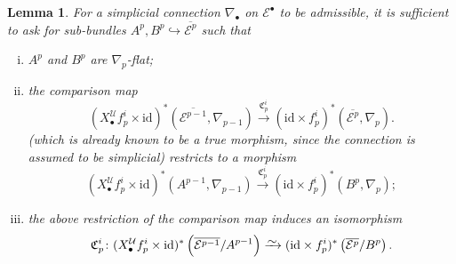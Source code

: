 \documentclass[11pt,fleqn]{article}
\theoremstyle{plain}
\newtheorem{lemma}[theorem]{Lemma}
\theoremstyle{definition}
\theoremstyle{remark}
\numberwithin{equation}{theorem}
\newcommand{\cover}{\mathcal{U}}
\newcommand{\id}{\mathrm{id}}
\newcommand{\congto}{\xrightarrow{\raisebox{-.5ex}[0ex][0ex]{$\sim$}}}
\newcommand{\nerve}[1]{X_{#1}^\cover}
\newcommand{\comparison}[1]{\mathfrak{C}_{#1}}
\begin{document}
        \begin{lemma}\label{lemma:admissible-simplicial-connection-criterion}
            For a simplicial connection $\nabla_\bullet$ on $\mathcal{E}^\bullet$ to be admissible, it is sufficient to ask for sub-bundles $A^p,B^p\hookrightarrow\overline{\mathcal{E}^{p}}$ such that
            \begin{enumerate}[(i)]
                \item $A^p$ and $B^p$ are $\nabla_{p}$-flat;
                \item the comparison map
                    \begin{equation*}
                        (\nerve{\bullet} f_p^i\times\id)^*\left(\overline{\mathcal{E}^{p-1}},\nabla_{p-1}\right)
                        \xrightarrow{\comparison{p}^i}
                        (\id\times f_p^i)^*\left(\overline{\mathcal{E}^p},\nabla_p\right).
                    \end{equation*}
                    (which is already known to be a \emph{true} morphism, since the connection is assumed to be simplicial) restricts to a morphism
                    \begin{equation*}
                        (\nerve{\bullet} f_p^i\times\id)^*\left(A^{p-1},\nabla_{p-1}\right)
                        \xrightarrow{\comparison{p}^i}
                        (\id\times f_p^i)^*\left(B^p,\nabla_p\right);
                    \end{equation*}
                \item the above restriction of the comparison map induces an isomorphism
                \begin{equation*}
                    \comparison{p}^i\colon
                    (\nerve{\bullet} f_p^i\times\id)^*\left(\overline{\mathcal{E}^{p-1}}/A^{p-1}\right)
                    \congto
                    (\id\times f_p^i)^*\left(\overline{\mathcal{E}^p}/B^p\right).
                \end{equation*}
            \end{enumerate}


\end{lemma}
\end{document}
